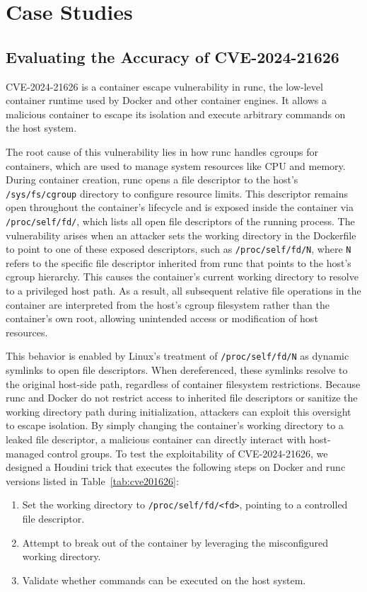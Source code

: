     \chapter{Case Studies}
\fontsize{12pt}{14pt} \selectfont
\begin{doublespace}




\section{Evaluating the Accuracy of CVE-2024-21626}
\label{sec:CVE-2024-21626}
CVE-2024-21626 \cite{runc-cve-2024-21626} is a container escape vulnerability in runc, the low-level container runtime used by Docker and other container engines. It allows a malicious container to escape its isolation and execute arbitrary commands on the host system.

The root cause of this vulnerability lies in how runc handles cgroups for containers, which are used to manage system resources like CPU and memory. During container creation, runc opens a file descriptor to the host's \texttt{/sys/fs/cgroup} directory to configure resource limits. This descriptor remains open throughout the container’s lifecycle and is exposed inside the container via \texttt{/proc/self/fd/}, which lists all open file descriptors of the running process. The vulnerability arises when an attacker sets the working directory in the Dockerfile to point to one of these exposed descriptors, such as \texttt{/proc/self/fd/N}, where \texttt{N} refers to the specific file descriptor inherited from runc that points to the host’s cgroup hierarchy. This causes the container’s current working directory to resolve to a privileged host path. As a result, all subsequent relative file operations in the container are interpreted from the host’s cgroup filesystem rather than the container’s own root, allowing unintended access or modification of host resources.

This behavior is enabled by Linux's treatment of \texttt{/proc/self/fd/N} as dynamic symlinks to open file descriptors. When dereferenced, these symlinks resolve to the original host-side path, regardless of container filesystem restrictions. Because runc and Docker do not restrict access to inherited file descriptors or sanitize the working directory path during initialization, attackers can exploit this oversight to escape isolation. By simply changing the container's working directory to a leaked file descriptor, a malicious container can directly interact with host-managed control groups.
To test the exploitability of CVE-2024-21626, we designed a Houdini trick that executes the following steps on Docker and runc versions listed in Table~\ref{tab:cve201626}:
\begin{enumerate}
    \item Set the working directory to \texttt{/proc/self/fd/<fd>}, pointing to a controlled file descriptor.
    \item Attempt to break out of the container by leveraging the misconfigured working directory.
    \item Validate whether commands can be executed on the host system.
\end{enumerate}


\end{doublespace}
